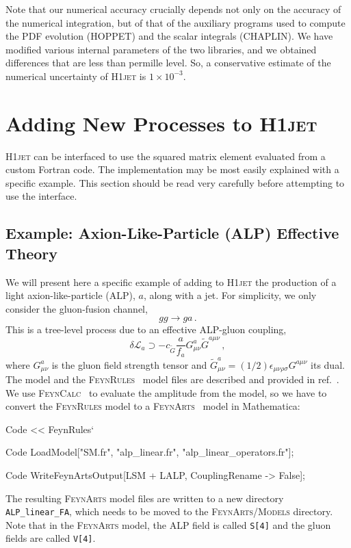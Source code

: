 \documentclass[12pt]{article}
\begin{document}
\newpage 

Note that our numerical accuracy crucially depends not only on the
accuracy of the numerical integration, but of that of the auxiliary
programs used to compute the PDF evolution (\textsc{HOPPET}) and the
scalar integrals (\textsc{CHAPLIN}). We have modified various internal
parameters of the two libraries, and we obtained differences that are
less than permille level. So, a conservative estimate of the numerical
uncertainty of \textsc{H1jet} is $1\times 10^{-3}$.

\section{Adding New Processes to \textsc{H1jet}}
\label{sec:newprocs} 
\textsc{H1jet} can be interfaced to use the squared matrix element
evaluated from a custom Fortran code. The implementation may be most
easily explained with a specific example. This section should be read very 
carefully before attempting to use the interface.

\subsection{Example: Axion-Like-Particle (ALP) Effective Theory}
We will present here a specific example of adding to \textsc{H1jet}
the production of a light axion-like-particle (ALP), $a$, along with a
jet. For simplicity, we only consider the gluon-fusion channel,
\begin{equation}
    g g \rightarrow g a \,. 
\end{equation}
This is a tree-level process due to an effective ALP-gluon coupling, 
\begin{equation}
   \delta \mathcal{L}_a \supset -c_{\tilde{G}}\frac{a}{f_a} G_{\mu\nu}^{a} \tilde{G}^{a \mu\nu} \,, \label{eq:ggacoupling}
\end{equation}
where $G_{\mu\nu}^{a}$ is the gluon field strength tensor and
$\tilde{G}^{a}_{ \mu\nu}=(1/2)\epsilon_{\mu\nu\rho\sigma}{G}^{a
  \mu\nu}$ its dual.  The model and the
\textsc{FeynRules}~\cite{Alloul:2013bka} model files are described and
provided in ref.~\cite{Brivio:2017ije}. We use
\textsc{FeynCalc}~\cite{Mertig:1990an,Shtabovenko:2016sxi,Shtabovenko:2020gxv}
to evaluate the amplitude from the model, so we have to convert the
\textsc{FeynRules} model to a \textsc{FeynArts}~\cite{Hahn:2000kx}
model in Mathematica:
\begin{mmaCell}{Code}
<< FeynRules` 
\end{mmaCell}
\begin{mmaCell}{Code}
LoadModel["SM.fr", "alp_linear.fr", "alp_linear_operators.fr"];  
\end{mmaCell}
\begin{mmaCell}{Code}
WriteFeynArtsOutput[LSM + LALP, CouplingRename -> False]; 
\end{mmaCell}
The resulting \textsc{FeynArts} model files are written to a new directory \texttt{ALP\_linear\_FA}, which needs to be moved to the \textsc{FeynArts/Models} directory. Note that in the \textsc{FeynArts} model, the ALP field is called \texttt{S[4]} and the gluon fields are called \texttt{V[4]}. 
\end{document}

